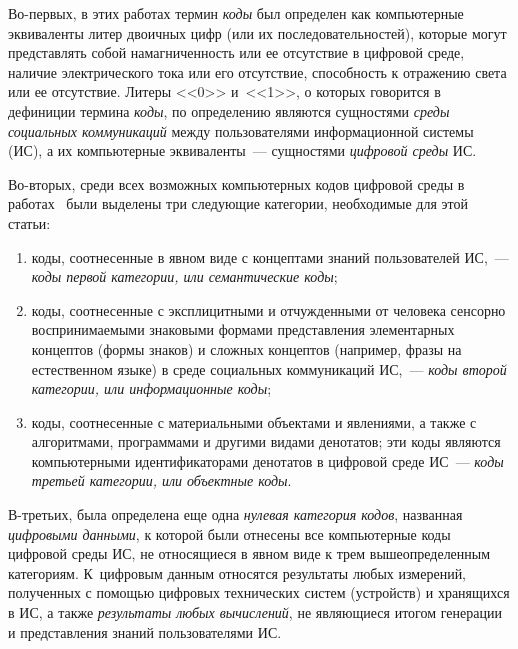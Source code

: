 \begin{multicols}{2}
   Во-первых, в этих работах термин \textit{коды} был определен как компьютерные 
эквиваленты литер двоичных цифр (или их последовательностей), которые могут 
представлять собой намагниченность или ее отсутствие в цифровой среде, наличие 
электрического тока или его отсутствие, способность к отражению света или ее отсутствие. 
Литеры <<0>> и~<<1>>, о которых говорится в дефиниции термина \textit{коды}, по 
определению являются сущностями \textit{среды социальных коммуникаций} между 
пользователями информационной системы (ИС), а их компьютерные эквиваленты~--- 
сущностями \textit{цифровой среды} ИС.
   
   Во-вторых, среди всех возможных компьютерных кодов цифровой среды в 
работах~\cite{8zat, 9zat} были выделены три следующие категории, необходимые для 
этой статьи:
   \begin{enumerate}[(1)]
\item коды, соотнесенные в явном виде с концептами знаний пользователей ИС,~--- 
\textit{коды первой категории, или семантические коды};
\item коды, соотнесенные с эксплицитными и от\-чуж\-ден\-ны\-ми от человека сенсорно 
воспринимаемыми знаковыми формами представления элементарных концептов 
(формы знаков) и сложных концептов (например, фразы на естественном языке) в 
среде социальных коммуникаций ИС,~--- \textit{коды второй категории, или 
информационные коды};
\item коды, соотнесенные с материальными объектами и явлениями, а также с 
алгоритмами, программами и другими видами денотатов; эти коды являются 
компьютерными идентификаторами денотатов в цифровой среде ИС~--- \textit{коды 
третьей категории, или объектные коды}.
\end{enumerate}


   В-третьих, была определена еще одна \textit{нулевая категория кодов}, названная 
\textit{цифровыми данными}, к которой были отнесены все компьютерные коды цифровой 
среды ИС, не относящиеся в явном виде\linebreak
 к трем вышеопределенным категориям. К~циф\-ро\-вым 
данным относятся результаты любых измерений, полученных с помощью цифровых 
технических систем (устройств) и хранящихся в ИС, а\linebreak
 также \textit{результаты любых 
вычислений}, не яв\-ля\-ющиеся итогом генерации и представления знаний пользователями ИС.
   

\end{multicols}

